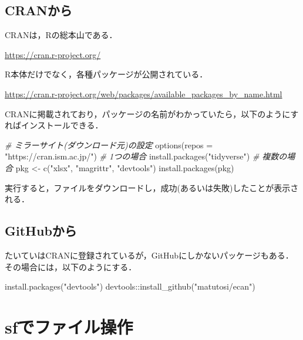 \documentclass[
]{article}
\newenvironment{Shaded}{\begin{snugshade}}{\end{snugshade}}
\newcommand{\AttributeTok}[1]{\textcolor[rgb]{0.77,0.63,0.00}{#1}}
\newcommand{\CommentTok}[1]{\textcolor[rgb]{0.56,0.35,0.01}{\textit{#1}}}
\newcommand{\FunctionTok}[1]{\textcolor[rgb]{0.00,0.00,0.00}{#1}}
\newcommand{\NormalTok}[1]{#1}
\newcommand{\OtherTok}[1]{\textcolor[rgb]{0.56,0.35,0.01}{#1}}
\newcommand{\SpecialCharTok}[1]{\textcolor[rgb]{0.00,0.00,0.00}{#1}}
\newcommand{\StringTok}[1]{\textcolor[rgb]{0.31,0.60,0.02}{#1}}
\begin{document}
\hypertarget{cran}{%
\subsection{CRANから}\label{cran}}

CRANは，Rの総本山である．

\url{https://cran.r-project.org/}

R本体だけでなく，各種パッケージが公開されている．

\url{https://cran.r-project.org/web/packages/available_packages_by_name.html}

CRANに掲載されており，パッケージの名前がわかっていたら，以下のようにすればインストールできる．

\begin{Shaded}
\begin{Highlighting}[]
  \CommentTok{\# ミラーサイト(ダウンロード元)の設定}
\FunctionTok{options}\NormalTok{(}\AttributeTok{repos =} \StringTok{"https://cran.ism.ac.jp/"}\NormalTok{)}
  \CommentTok{\# 1つの場合}
\FunctionTok{install.packages}\NormalTok{(}\StringTok{"tidyverse"}\NormalTok{)}
  \CommentTok{\# 複数の場合}
\NormalTok{pkg }\OtherTok{\textless{}{-}} \FunctionTok{c}\NormalTok{(}\StringTok{"xlsx"}\NormalTok{, }\StringTok{"magrittr"}\NormalTok{, }\StringTok{"devtools"}\NormalTok{)}
\FunctionTok{install.packages}\NormalTok{(pkg)}
\end{Highlighting}
\end{Shaded}

実行すると，ファイルをダウンロードし，成功(あるいは失敗)したことが表示される．

\hypertarget{github}{%
\subsection{GitHubから}\label{github}}

たいていはCRANに登録されているが，GitHubにしかないパッケージもある．
その場合には，以下のようにする．

\begin{Shaded}
\begin{Highlighting}[]
\FunctionTok{install.packages}\NormalTok{(}\StringTok{"devtools"}\NormalTok{)}
\NormalTok{devtools}\SpecialCharTok{::}\FunctionTok{install\_github}\NormalTok{(}\StringTok{"matutosi/ecan"}\NormalTok{)}
\end{Highlighting}
\end{Shaded}

\hypertarget{sf}{%
\section{sfでファイル操作}\label{sf}}
\end{document}
